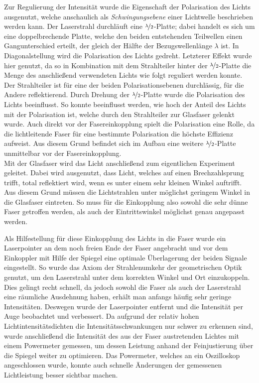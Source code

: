  Zur Regulierung der Intensität wurde die Eigenschaft der Polarisation des Lichts ausgenutzt, welche anschaulich als \textit{Schwingungsebene} einer Lichtwelle beschrieben werden kann. Der Laserstrahl durchläuft eine $\nicefrac{\lambda}{2}$-Platte; dabei handelt es sich um eine doppelbrechende Platte, welche den beiden entstehenden Teilwellen einen Gangunterschied erteilt, der gleich der Hälfte der Bezugswellenlänge $\lambda$ ist. In Diagonalstellung wird die Polarisation des Lichts gedreht. Letzterer Effekt wurde hier genutzt, da so in Kombination mit dem Strahlteiler hinter der $\nicefrac{\lambda}{2}$-Platte die Menge des anschließend verwendeten Lichts wie folgt reguliert werden konnte. Der Strahlteiler ist für eine der beiden Polarisationsebenen durchlässig, für die Andere reflektierend. Durch Drehung der $\nicefrac{\lambda}{2}$-Platte wurde die Polarisation des Lichts beeinflusst. So konnte beeinflusst werden, wie hoch der Anteil des Lichts mit der Polarisation ist, welche durch den Strahlteiler zur Glasfaser gelenkt wurde. Auch direkt vor der Fasereinkopplung spielt die Polarisation eine Rolle, da die lichtleitende Faser für eine bestimmte Polarisation die höchste Effizienz aufweist. Aus diesem Grund befindet sich im Aufbau eine weitere $\nicefrac{\lambda}{2}$-Platte unmittelbar vor der Fasereinkopplung.\\

Mit der Glasfaser wird das Licht anschließend zum eigentlichen Experiment geleitet. Dabei wird ausgenutzt, dass Licht, welches auf einen Brechzahlsprung trifft, total reflektiert wird, wenn es unter einem sehr kleinen Winkel auftrifft. Aus diesem Grund müssen die Lichtstrahlen unter möglichst geringem Winkel in die Glasfaser eintreten. So muss für die Einkopplung also sowohl die sehr dünne Faser getroffen werden, als auch der Eintrittswinkel möglichst genau angepasst werden.

Als Hilfestellung für diese Einkopplung des Lichts in die Faser wurde ein Laserpointer an dem noch freien Ende der Faser angebracht und vor dem Einkoppler mit Hilfe der Spiegel eine optimale Überlagerung der beiden Signale eingestellt. So wurde das Axiom der Strahlenumkehr der geometrischen Optik genutzt, um den Laserstrahl unter dem korrekten Winkel und Ort einzukoppeln. Dies gelingt recht schnell, da jedoch sowohl die Faser als auch der Laserstrahl eine räumliche Ausdehnung haben, erhält man anfangs häufig sehr geringe Intensitäten. Deswegen wurde der Laserpointer entfernt und die Intensität per Auge beobachtet und verbessert. Da aufgrund der relativ hohen Lichtintensitätsdichten die Intensitätsschwankungen  nur schwer zu erkennen sind, wurde anschließend die Intensität des aus der Faser austretenden Lichtes mit einem Powermeter gemessen, um dessen Leistung anhand der Feinjustierung über die Spiegel weiter zu optimieren. Das Powermeter, welches an ein Oszilloskop angeschlossen wurde, konnte auch schnelle Änderungen der gemessenen Lichtleistung besser sichtbar machen.

